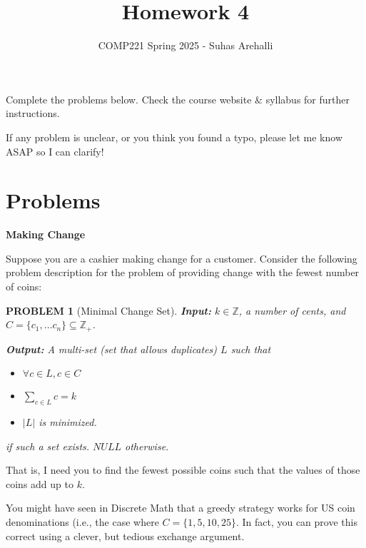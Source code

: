 \documentclass{exam}
\title{Homework 4}
\author{COMP221 Spring 2025 - Suhas Arehalli}
\date{}
\theoremstyle{prob}
\newtheorem*{probstate}{PROBLEM}
\begin{document}
\maketitle

Complete the problems below. Check the course website \& syllabus for further instructions.

If any problem is unclear, or you think you found a typo, please let me know ASAP so I can clarify!

\section*{Problems}

\begin{questions}
    \question \textbf{Making Change} 
    
    Suppose you are a cashier making change for a customer. Consider the following problem description for the problem of providing change with the fewest number of coins:
    \begin{probstate}[Minimal Change Set]
        \textbf{Input:} $k \in \mathbb{Z}$, a number of cents, and $C = \{c_1, \dots c_n\} \subseteq \mathbb{Z}_+$. 
        
        \textbf{Output:} A multi-set (set that allows duplicates) $L$ such that 
        \begin{itemize}
            \item $\forall c \in L, c \in C$
            \item $\sum_{c \in L} c = k$
            \item $\lvert L \rvert$ is minimized.
        \end{itemize}
        if such a set exists. $NULL$ otherwise.
    \end{probstate}
    That is, I need you to find the fewest possible coins such that the values of those coins add up to $k$. 

    You might have seen in Discrete Math that a greedy strategy works for US coin denominations (i.e., the case where $C = \{1, 5, 10, 25\}$. In fact, you can prove this correct using a clever, but tedious exchange argument.
\end{questions}
\end{document}
